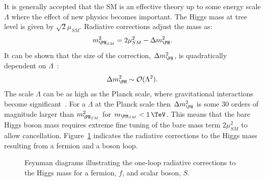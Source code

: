 It is generally accepted that the \ac{SM} is an effective theory up to some
energy scale $\Lambda$ where the effect of new physics becomes important. 
The Higgs mass at tree level is given by $\sqrt{2}\mu_{SM}$. Radiative
corrections adjust the mass as:
\begin{equation}
m_{\PH_{SM}}^{2} = 2\mu_{SM}^{2} - \Delta m_{\PH}^{2}. 
\end{equation}
It can be shown that the size of the correction, $\Delta m_{\PH}^{2}$, is
quadratically dependent on $\Lambda$~\cite{Carena:2002es}:
\begin{equation}
\Delta m_{\PH}^{2} \sim \mathcal{O}(\Lambda^{2}).
\end{equation}
The scale $\Lambda$ can be as high as the Planck scale, where gravitational
interactions become significant~\cite{Griffiths:2008nx}. For a $\Lambda$ at the Planck scale then
$\Delta m_{\PH}^{2}$ is some 30 orders of magnitude larger than 
$m_{\PH_{SM}}^{2}$ for $m_{\PH_{SM}}<1\,\TeV$. This means that the bare Higgs
boson mass requires extreme fine tuning of the bare mass term $2\mu_{SM}^{2}$ to
allow cancellation. Figure~\ref{fig:HiggsMassLoops} indicates the radiative
corrections to the Higgs mass resulting from a fermion and a boson loop.

\begin{figure}[htbp]
\caption{Feynman diagrams illustrating the one-loop radiative corrections to the Higgs
mass for a fermion, $f$, and scalar boson, $S$.}
\label{fig:HiggsMassLoops}
\end{figure}

